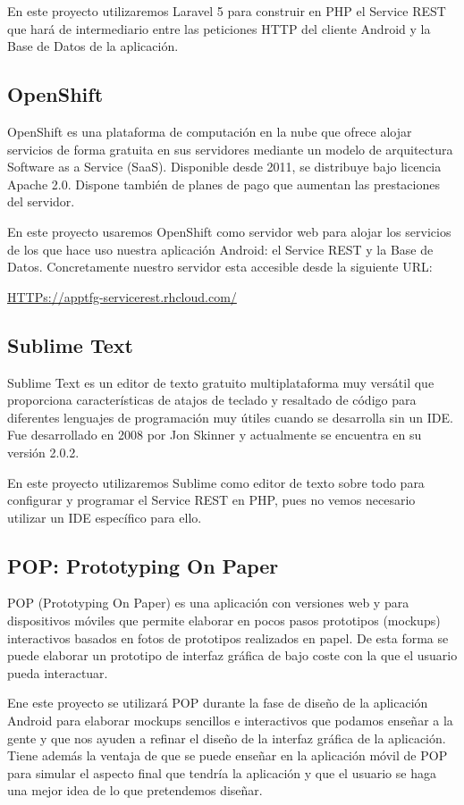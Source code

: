 	En este proyecto utilizaremos Laravel 5 para construir en PHP el Service REST que hará de intermediario entre las peticiones HTTP del cliente Android y la Base de Datos de la aplicación.
    
    \subsection{OpenShift}\label{ssec:openshift}
    
	OpenShift \cite{ref:OpenShift} es una plataforma de computación en la nube que ofrece alojar servicios de forma gratuita en sus servidores mediante un modelo de arquitectura Software as a Service (SaaS). Disponible desde 2011, se distribuye bajo licencia Apache 2.0. Dispone también de planes de pago que aumentan las prestaciones del servidor.
	
	En este proyecto usaremos OpenShift como servidor web para alojar los servicios de los que hace uso nuestra aplicación Android: el Service REST y la Base de Datos. Concretamente nuestro servidor esta accesible desde la siguiente URL:
	
	\url{HTTPs://apptfg-servicerest.rhcloud.com/}    
    
    \subsection{Sublime Text}\label{ssec:sublime}
    
    Sublime Text \cite{ref:sublime} es un editor de texto gratuito multiplataforma muy versátil que proporciona características de atajos de teclado y resaltado de código para diferentes lenguajes de programación muy útiles cuando se desarrolla sin un IDE. Fue desarrollado en 2008 por Jon Skinner y actualmente se encuentra en su versión 2.0.2.
    
    En este proyecto utilizaremos Sublime como editor de texto sobre todo para configurar y programar el Service REST en PHP, pues no vemos necesario utilizar un IDE específico para ello.
    
    \subsection{POP: Prototyping On Paper}\label{ssec:pop}
    
    POP \cite{ref:pop} (Prototyping On Paper) es una aplicación con versiones web y para dispositivos móviles que permite elaborar en pocos pasos prototipos (mockups) interactivos basados en fotos de prototipos realizados en papel. De esta forma se puede elaborar un prototipo de interfaz gráfica de bajo coste con la que el usuario pueda interactuar.
    
    Ene este proyecto se utilizará POP durante la fase de diseño de la aplicación Android para elaborar mockups sencillos e interactivos que podamos enseñar a la gente y que nos ayuden a refinar el diseño de la interfaz gráfica de la aplicación. Tiene además la ventaja de que se puede enseñar en la aplicación móvil de POP para simular el aspecto final que tendría la aplicación y que el usuario se haga una mejor idea de lo que pretendemos diseñar.
    